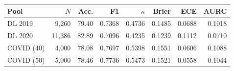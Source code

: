 \begin{tabular}{@{}lrrrrrrr@{}}
\toprule
Pool & $N$ & Acc. & F1 & $\kappa$ & Brier & ECE & AURC \\
\midrule
DL 2019 & 9,260 & 79.40 & 0.7368 & 0.4736 & 0.1485 & 0.0688 & 0.1018 \\
DL 2020 & 11,386 & 82.89 & 0.7096 & 0.4235 & 0.1239 & 0.1112 & 0.0710 \\
COVID (40) & 4,000 & 78.08 & 0.7697 & 0.5398 & 0.1551 & 0.0606 & 0.1088 \\
COVID (50) & 5,000 & 78.46 & 0.7736 & 0.5473 & 0.1521 & 0.0558 & 0.1044 \\
\bottomrule
\end{tabular}
